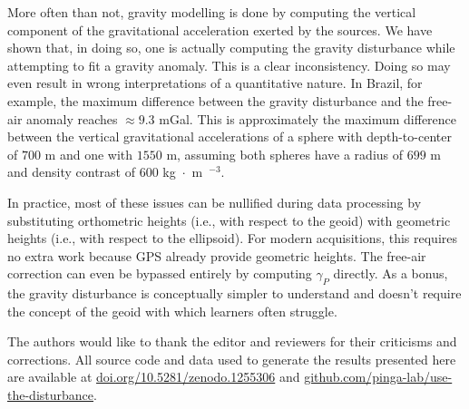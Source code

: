 \documentclass[extra]{gji}
\begin{document}
More often than not, gravity modelling is done by computing the
vertical component of the gravitational acceleration exerted by the sources.
We have shown that, in doing so, one is actually computing the gravity
disturbance while attempting to fit a gravity anomaly.
This is a clear inconsistency.
Doing so may even result in wrong interpretations of a quantitative nature.
In Brazil, for example, the maximum difference
between the gravity disturbance and the free-air anomaly reaches $\approx 9.3$ mGal.
This is approximately the maximum difference between the vertical gravitational
accelerations of a sphere with depth-to-center of $700$ m and one with $1550$ m,
assuming both spheres have a radius of $699$ m and density contrast of
$600$ kg~$\cdot$~m~$^{-3}$.

In practice, most of these issues can be nullified during data processing by
substituting orthometric heights (i.e., with respect to the geoid) with
geometric heights (i.e., with respect to the ellipsoid).
For modern acquisitions, this requires no extra work because GPS already
provide geometric heights.
The free-air correction can even be bypassed entirely by computing $\gamma_P$
directly.
As a bonus, the gravity disturbance is conceptually simpler to understand and
doesn't require the concept of the geoid with which learners often struggle.


\begin{acknowledgments}
The authors would like to thank the editor and reviewers for their criticisms
and corrections.
All source code and data used to generate the results presented here are
available at
\href{https://doi.org/10.5281/zenodo.1255306}{doi.org/10.5281/zenodo.1255306}
and
\href{https://github.com/pinga-lab/use-the-disturbance}{github.com/pinga-lab/use-the-disturbance}.
\end{acknowledgments}



\end{document}

